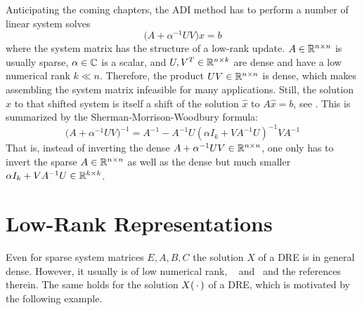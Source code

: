 Anticipating the coming chapters,
the \ac{ADI} method has to perform a number of linear system solves
\begin{equation}
  \big(A + \alpha^{-1} UV \big) x = b
\end{equation}
where the system matrix has the structure of a low-rank update.
$A\in\mathbb{R}^{n\times n}$ is usually sparse,
$\alpha\in\mathbb{C}$ is a scalar,
and $U, V^T \in\mathbb{R}^{n\times k}$ are dense and have a low numerical rank $k\ll n$.
Therefore, the product $UV \in\mathbb{R}^{n\times n}$ is dense,
which makes assembling the system matrix infeasible for many applications.
Still, the solution $x$ to that shifted system is itself a shift of the solution $\hat x$ to $A\hat x = b$,
see \eg \cite{Strang2016, Golub2013}.
This is summarized by the Sherman-Morrison-Woodbury formula:
\begin{equation}
  \big( A + \alpha^{-1}UV \big)^{-1} =
  A^{-1} - A^{-1} U (\alpha I_k + V A^{-1} U)^{-1} V A^{-1}
\end{equation}
That is, instead of inverting the dense $A + \alpha^{-1} UV \in\mathbb{R}^{n\times n}$,
one only has to invert the sparse $A \in \mathbb{R}^{n\times n}$ as well as the dense but much smaller $\alpha I_k + VA^{-1} U \in\mathbb{R}^{k\times k}$.

\section{Low-Rank Representations}
\label{sec:lowrank}

Even for sparse system matrices $E, A, B, C$
the solution $X$ of a \ac{DRE} is in general dense.
However, it usually is of low numerical rank,
\cf \eg~\cite[Section~2.1.4]{Lang2017}
and~\cite[Sections~2.3.3 and~2.3.4]{Kuerschner2016}
and the references therein.
The same holds for the solution $X(\optional{})$ of a \ac{DRE},
which is motivated by the following example.

